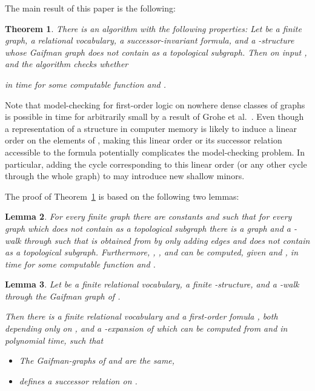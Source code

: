 \documentclass[12pt]{amsart}
\newtheorem{theorem}{Theorem}[section]
\newtheorem{lemma}[theorem]{Lemma}
\begin{document}
The main result of this paper is the following:
\begin{theorem}
  \label{thm:mainthm}
  There is an algorithm  with the following properties:
  Let  be a finite graph,  a relational vocabulary,  a successor-invariant formula, and
   a -structure whose Gaifman graph does not contain  as
  a topological subgraph. Then on input ,  and  the
  algorithm  checks whether
  
  in time  for some
  computable function  and .
\end{theorem}

Note that model-checking for first-order logic on nowhere dense
classes of graphs is possible in time  for arbitrarily small  by a
result of Grohe et al.~\cite{gks14}. Even though a representation of a
structure  in computer memory is likely to induce a linear order on
the elements of , making this linear order or its successor
relation accessible to the formula  potentially complicates
the model-checking problem. In particular, adding the cycle
corresponding to this linear order (or any other cycle through the
whole graph) to  may introduce new shallow minors.

The proof of Theorem~\ref{thm:mainthm} is based on the following two lemmas:
\begin{lemma}
  \label{lem:kwalktopsub}
  For every finite graph  there are constants  and  such that for every graph  which does not contain  as a
  topological subgraph there is a graph  and a -walk  through  such that  is obtained from 
  by only adding edges and  does not contain  as a
  topological subgraph. Furthermore, , ,  and  can be
  computed, given  and , in time  for some computable function  and .
\end{lemma}
\begin{lemma}
  \label{lem:succfromkwalk}
  Let  be a finite relational vocabulary,  a finite
  -structure, and  a -walk through the
  Gaifman graph of .

  Then there is a finite relational vocabulary  and a
  first-order fomula , both depending only
  on , and a -expansion  of  which can
  be computed from  and  in polynomial time, such that
  \begin{itemize}
  \item The Gaifman-graphs of  and  are the same,
  \item  defines a successor relation on .
  \end{itemize}
\end{lemma}
\end{document}
